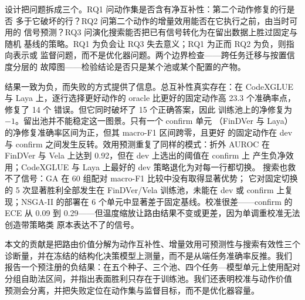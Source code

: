 设计把问题拆成三个。RQ1 问动作集是否含有净互补性：第二个动作修复的行是否
多于它破坏的行？RQ2 问第二个动作的增量效用能否在它执行之前，由当时可用的
信号预测？RQ3 问演化搜索能否把已有信号转化为在留出数据上胜过固定与随机
基线的策略。RQ1 为负会让 RQ3 失去意义；RQ1 为正而 RQ2 为负，则指向表示或
监督问题，而不是优化器问题。两个边界检查——跨任务迁移与按置信度分层的
故障图——检验结论是否只是某个池或某个配置的产物。

结果一致为负，而失败的方式提供了信息。总互补性真实存在：在 CodeXGLUE 与
Laya 上，逐行选择更好动作的 oracle 比更好的固定动作高 23.3 个准确率点，
\choice{} 修复了 14 个 \noul{} 错误。但它同时破坏了 15 个正确答案，因此
训练池上的净修复为 $-1$。留出池并不能稳定这一图景。只有一个 confirm 单元
（FinDVer 与 Laya）的净修复准确率区间为正，但其 macro-F1 区间跨零，且更好
的固定动作在 dev 与 confirm 之间发生反转。效用预测重复了同样的模式：折外
AUROC 在 FinDVer 与 Vela 上达到 0.92，但在 dev 上选出的阈值在 confirm 上
产生负净效用；CodeXGLUE 与 Laya 上最好的 dev 策略退化为对每一行都切换。
搜索也救不了信号：GA 在 60 组配对 macro-F1 比较中没有取得显著优势；
它对固定切换的 5 次显著胜利全部发生在 FinDVer/Vela 训练池，未能在 dev 或
confirm 上复现；NSGA-II 的部署在 6 个单元中显著差于固定基线。校准很差——confirm 的 ECE 从 0.09 到
0.29——但温度缩放让路由结果不变或更差，因为单调重校准无法创造带策略类
原本表达不了的信号。

本文的贡献是把路由价值分解为动作互补性、增量效用可预测性与搜索有效性三个
诊断量，并在冻结的结构化决策模型上测量，而不是从端任务准确率反推。我们
报告一个预注册的负结果：在五个种子、三个池、四个任务—模型单元上使用配对
分组自助法区间，并指出表面胜利只存在于训练池。我们还表明校准与动作价值
预测会分离，并把失败定位在动作集与监督目标，而不是优化器容量。
